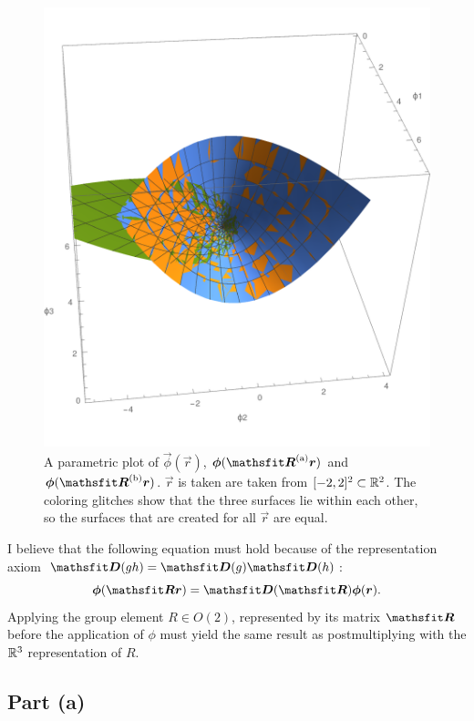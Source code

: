 \documentclass[11pt, english, fleqn, DIV=15, headinclude, BCOR=1cm]{scrartcl}
\begin{document}
\begin{figure}[htbp]
    \centering
    \includegraphics[width=.6\linewidth]{phi.pdf}
    \caption{%
        A parametric plot of $\vec\phi(\vec r)$, $\vec\phi(\Ra \vec r)$ and
        $\vec\phi(\Rb \vec r)$. $\vec r$ is taken are taken from $[-2,2]^2
        \subset \mathbb R^2$. The coloring glitches show that the three surfaces lie
        within each other, so the surfaces that are created for all $\vec r$
        are equal.
    }
    \label{fig:3d}
\end{figure}

I believe that the following equation must hold because of the representation
axiom $\tens D(gh) = \tens D(g) \tens D(h)$:
\[
    \vec \phi(\tens R \vec r) = \tens D(\tens R) \vec \phi(\vec r).
\]
Applying the group element $R \in O(2)$, represented by its matrix $\tens R$
before the application of $\phi$ must yield the same result as postmultiplying
with the $\mathbb R^3$ representation of $R$.

\subsection{Part (a)}
\end{document}
